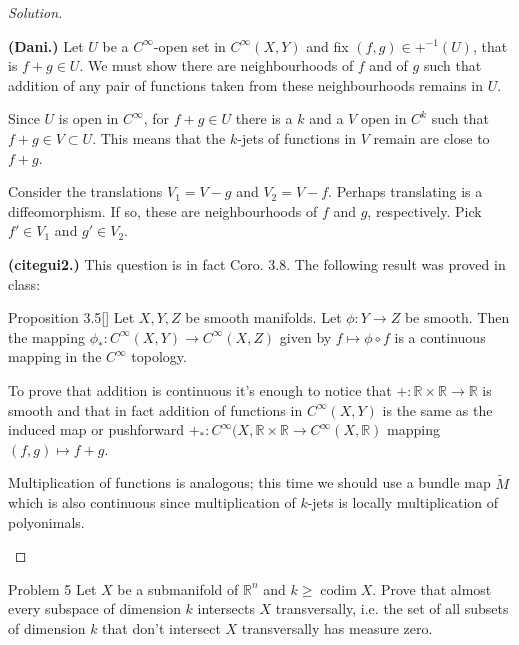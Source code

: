 \begin{proof}[Solution]
\begin{enumerate}[label=(\alph*)]
	\textbf{(Dani.)} Let \(U\) be a \(C^\infty\)-open set in \(C^\infty(X,Y)\) and fix \((f,g) \in +^{-1}(U)\), that is \(f+g \in U\). We must show there are neighbourhoods of \(f\) and of \(g\) such that addition of any pair of functions taken from these neighbourhoods remains in \(U\).


	Since \(U\) is open in \(C^\infty\), for \(f+g \in U\) there is a \(k\) and a \(V\) open in \(C^k\) such that \(f + g \in V \subset U\). This means that the \(k\)-jets of functions in \(V\) remain are close to \(f+g\).

	Consider the translations \(V_1=V-g\) and \(V_2=V-f\). Perhaps translating is a diffeomorphism. If so, these are neighbourhoods of \(f\) and \(g\), respectively. Pick \(f' \in V_1\) and \(g' \in V_2\).

	
	\textbf{(cite{gui2}.)} This question is in fact Coro. 3.8. The following result was proved in class:

	\begin{thing6}{Proposition 3.5}[\cite{gui2}]\label{prop:3.5}\leavevmode
Let \(X,Y,Z\) be smooth manifolds. Let \(\phi:Y \to Z\) be smooth. Then the mapping \(\phi_*:C^\infty (X,Y) \to C^\infty(X,Z)\) given by \(f \mapsto \phi \circ f\) is a continuous mapping in the \(C^\infty\) topology.
	\end{thing6}
	To prove that addition is continuous it's enough to notice that \(+: \mathbb{R} \times \mathbb{R} \to \mathbb{R}\) is smooth and that in fact addition of functions in \(C^\infty(X,Y)\) is the same as the induced map or pushforward \(+_*:C^\infty(X,\mathbb{R} \times \mathbb{R} \to C^\infty(X,\mathbb{R})\) mapping \((f,g) \mapsto f+g\).\fi

	Multiplication of functions is analogous; this time we should use a bundle map \(\tilde{M}\) which is also continuous since multiplication of \(k\)-jets is locally multiplication of polyonimals.
\end{enumerate}
\end{proof}

\begin{thing1}{Problem 5}\label{prob:5}\leavevmode
Let \(X\) be a submanifold of \(\mathbb{R}^n\) and \(k \geq  \operatorname{codim}X\). Prove that almost every subspace of dimension \(k\) intersects \(X\) transversally, i.e. the set of all subsets of dimension \(k\) that don't intersect \(X\) transversally has measure zero.
\end{thing1}

